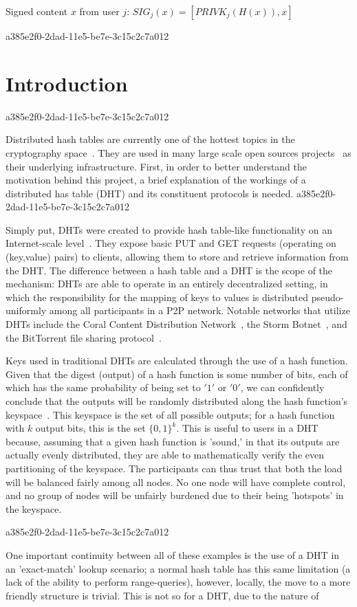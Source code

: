 \documentclass[12pt]{article}
\begin{document}
Signed content $x$ from user $j$: $SIG_j(x) = \left[ PRIVK_j( H(x) ), x \right]$

a385e2f0-2dad-11e5-be7e-3c15c2c7a012\section{Introduction}
a385e2f0-2dad-11e5-be7e-3c15c2c7a012\par Distributed hash tables are currently one of the hottest topics in the cryptography space~\cite{Stoica:2001dj,Rowstron:2001ea,Ratnasamy:2001wn}. They are used in many large scale open sources projects~\cite{Freitas:2013tb,Xu:2010vs,Perfitt:2010fh} as their underlying infrastructure. First, in order to better understand the motivation behind this project, a brief explanation of the workings of a distributed has table (DHT) and its constituent protocols is needed.
a385e2f0-2dad-11e5-be7e-3c15c2c7a012
\par Simply put, DHTs were created to provide hash table-like functionality on an Internet-scale level~\cite{Ratnasamy:2001wn}. They expose basic PUT and GET requests (operating on (key,value) pairs) to clients, allowing them to store and retrieve information from the DHT. The difference between a hash table and a DHT is the scope of the mechanism: DHTs are able to operate in an entirely decentralized setting, in which the responsibility for the mapping of keys to values is distributed pseudo-uniformly among all participants in a P2P network. Notable networks that utilize DHTs include the Coral Content Distribution Network~\cite{Freedman:2004vb}, the Storm Botnet~\cite{Holz:2008uk}, and the BitTorrent file sharing protocol~\cite{Cohen:y1_8mBnw}.

\par Keys used in traditional DHTs are calculated through the use of a hash function. Given that the digest (output) of a hash function is some number of bits, each of which has the same probability of being set to $'1'$ or $'0'$, we can confidently conclude that the outputs will be randomly distributed along the hash function's keyspace~. This keyspace is the set of all possible outputs; for a hash function with $k$ output bits, this is the set $\{0,1\}^k$. This is useful to users in a DHT because, assuming that a given hash function is 'sound,' in that its outputs are actually evenly distributed, they are able to mathematically verify the even partitioning of the keyspace. The participants can thus trust that both the load will be balanced fairly among all nodes. No one node will have complete control, and no group of nodes will be unfairly burdened due to their being 'hotspots' in the keyspace.~

a385e2f0-2dad-11e5-be7e-3c15c2c7a012\par One important continuity between all of these examples is the use of a DHT in an 'exact-match' lookup scenario; a normal hash table has this same limitation (a lack of the ability to perform range-queries), however, locally, the move to a more friendly structure is trivial. This is not so for a DHT, due to the nature of
\printbibliography
\end{document}
